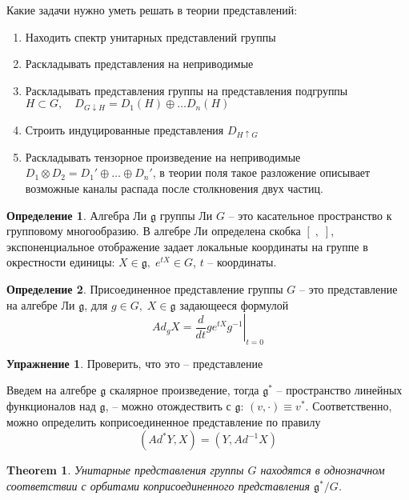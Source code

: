 \documentclass[a4paper,12pt]{article}
\newtheorem{theorem}{Theorem}
\theoremstyle{definition}
\theoremstyle{definition}
\theoremstyle{definition}
\newtheorem{definition}{Определение}
\theoremstyle{definition}
\newtheorem{exercise}{Упражнение}
\newcommand{\gf}{\mathfrak{g}}
\begin{document}
Какие задачи нужно уметь решать в теории представлений:
\begin{enumerate}
\item Находить спектр унитарных представлений группы
\item Раскладывать представления на неприводимые
\item Раскладывать представления группы на представления подгруппы
  $H\subset G,\quad D_{G\downarrow H}=D_{1}(H)\oplus \dots D_{n}(H)$
\item Строить индуцированные представления $D_{H\uparrow G}$
\item Раскладывать тензорное произведение на неприводимые
  $D_{1}\otimes D_{2}=D_{1}'\oplus\dots \oplus D_{n}'$, в теории поля такое разложение описывает
  возможные каналы распада после столкновения двух частиц. 
\end{enumerate}
\begin{definition}
  Алгебра Ли $\gf$ группы Ли $G$ -- это касательное пространство к групповому многообразию. В
  алгебре Ли определена скобка $[\;,\;]$, экспоненциальное отображение задает локальные координаты
  на группе в окрестности единицы: $X\in \gf, \; e^{tX}\in G$, $t$ -- координаты. 
\end{definition}
\begin{definition}
  Присоединенное представление группы $G$ -- это представление на алгебре Ли $\gf$, для $g\in G, \;
  X\in \gf$ задающееся формулой
  \begin{equation}
    \label{eq:7}
    Ad_{g} X=\left.\frac{d}{dt}g e^{tX} g^{-1}\right|_{t=0}
  \end{equation}

\end{definition}

\begin{exercise}
  Проверить, что это -- представление
\end{exercise}

Введем на алгебре $\gf$ скалярное произведение, тогда $\gf^{*}$ -- пространство линейных
функционалов над $\gf$, -- можно отождествить с $\gf$: $(v,\cdot)\equiv v^{*}$. Соответственно,
можно определить коприсоединенное представление по правилу
\begin{equation}
  \label{eq:8}
  (Ad^{*} Y,X)=(Y,Ad^{-1}X)
\end{equation}

\begin{theorem}
  Унитарные представления группы $G$ находятся в однозначном соответствии с орбитами
  коприсоединенного представления $\gf^{*}/G$.
\end{theorem}
\end{document}
